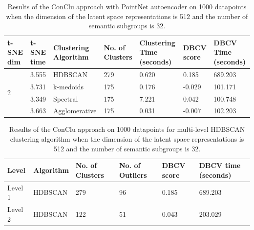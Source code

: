 \begin{table}[H]
  \setlength\extrarowheight{10pt}
  \caption{Results of the ConClu approach with PointNet autoencoder on 1000 datapoints when the dimension of the latent space representations is 512 and the number of semantic subgroups is 32. }
  \centering
  \begin{tabular}{|p{30pt}|p{50pt}|p{60pt}|p{50pt}|p{50pt}|p{50pt}|p{40pt}|}
    \toprule
    \ac{t-SNE} dim	& \ac{t-SNE} time & Clustering Algorithm & No. of Clusters & Clustering Time (seconds) & \ac{DBCV} score & \ac{DBCV} Time (seconds)\\
    \midrule
    \multirow{4}{30pt}{2}	& 3.555 & \ac{HDBSCAN}	& 279	& 0.620 & 0.185	& 689.203 \\ \cline{2-7} 
    & 3.731 & k-medoids	& 175	& 0.176 & -0.029	& 101.171 \\ \cline{2-7} 
    & 3.349 & Spectral	& 175	& 7.221 & 0.042 	& 100.748 \\ \cline{2-7}
    & 3.663 & Agglomerative	& 175	& 0.031 & -0.007	& 102.203 \\ 
    \bottomrule
  \end{tabular}
  \label{tab:conclu_k_32}
\end{table}

\begin{table}[H]
  \setlength\extrarowheight{10pt}
  \caption{Results of the ConClu approach on 1000 datapoints for multi-level \ac{HDBSCAN} clustering algorithm when the dimension of the latent space representations is 512 and the number of semantic subgroups is 32. }
  \centering
  \begin{tabular}{|l|l|l|l|l|l|}
    \toprule
    Level & Algorithm	& No. of Clusters	& No. of Outliers	& DBCV score	& \ac{DBCV} time (seconds)	\\  
    \midrule
    Level 1 & \ac{HDBSCAN} & 279	& 96	& 0.185	& 689.203 \\ \cline{1-6}
    Level 2 & \ac{HDBSCAN}	& 122	& 51	& 0.043	& 203.029 \\ 
    \bottomrule
  \end{tabular}
  \label{tab:conclu_k_32_levels}
\end{table}

